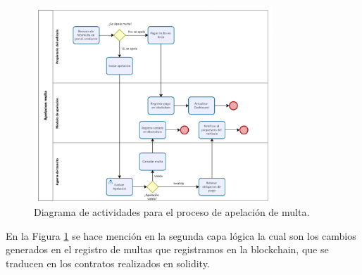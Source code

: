 \documentclass[
    letterpaper, 
    man,   
    spanish,
    12pt,
    donotrepeattitle,
    floatsintext,
    hidelinks %
]{apa7}
\begin{document}
 \begin{figure}[htbp]
    \centering
    \includegraphics[width=0.8\textwidth]{Images/ActApelacion.png}
    \caption{Diagrama de actividades para el proceso de apelación de multa.}
    \label{fig:diagrama_apelacion}
\end{figure}
En la Figura \ref{fig:diagrama_apelacion} se hace mención en la segunda capa lógica la cual son los cambios generados en el registro de multas que registramos en la blockchain, que se traducen en los contratos realizados en solidity.
\end{document}
